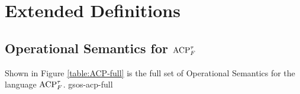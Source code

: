 \documentclass[../hons_project.tex]{subfiles}
\begin{document}
\section{Extended Definitions}
\subsection{Operational Semantics for \texorpdfstring{$\mathrm{ACP}_{F}^{\tau}$}{acptf}}\label{ssec:acptf-sos-full}

Shown in Figure \ref{table:ACP-full} is the full set of Operational Semantics for the language $\mathrm{ACP}_{F}^{\tau}$. 
{gsos-acp-full}
\end{document}
